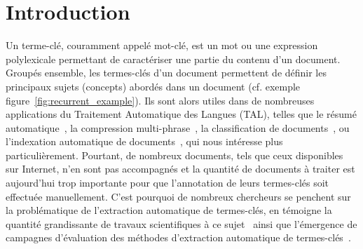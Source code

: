 \section{Introduction}
\label{sec:introduction}
  Un terme-clé, couramment appelé mot-clé, est un mot ou une expression
  polylexicale permettant de caractériser une partie du contenu d'un document.
  Groupés ensemble, les termes-clés d'un document permettent de définir les
  principaux sujets (concepts) abordés dans un document (cf. exemple
  figure~\ref{fig:recurrent_example}). Ils sont alors utiles dans de
  nombreuses applications du Traitement Automatique des Langues (TAL), telles
  que  le résumé automatique~\cite{avanzo2005keyphrase}, la compression
  multi-phrase~\cite{boudin2013multisentencecompression}, la classification de
  documents~\cite{han2007webdocumentclustering}, ou l'indexation automatique de
  documents~\cite{medelyan2008smalltrainingset}, qui nous intéresse plus
  particulièrement. Pourtant, de nombreux documents, tels que ceux disponibles
  sur Internet, n'en sont pas accompagnés et la quantité de documents à traiter
  est aujourd'hui trop importante pour que l'annotation de leurs termes-clés
  soit effectuée manuellement. C'est pourquoi de nombreux chercheurs se penchent
  sur la problématique de l'extraction automatique de termes-clés, en témoigne
  la quantité grandissante de travaux scientifiques à ce
  sujet~\cite{hasan2014state_of_the_art} ainsi que l'émergence de campagnes
  d'évaluation des méthodes d'extraction automatique de
  termes-clés~\cite{kim2010semeval,paroubek2012deft}.

